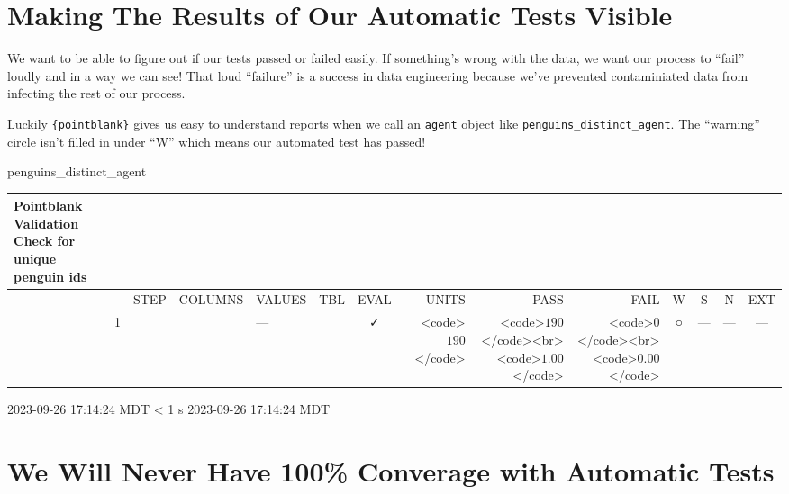 \documentclass[
  letterpaper,
  DIV=11,
  numbers=noendperiod]{scrreprt}
\newenvironment{Shaded}{\begin{snugshade}}{\end{snugshade}}
\newcommand{\NormalTok}[1]{\textcolor[rgb]{0.00,0.23,0.31}{#1}}
\begin{document}
\hypertarget{making-the-results-of-our-automatic-tests-visible}{%
\section{Making The Results of Our Automatic Tests
Visible}\label{making-the-results-of-our-automatic-tests-visible}}

We want to be able to figure out if our tests passed or failed easily.
If something's wrong with the data, we want our process to ``fail''
loudly and in a way we can see! That loud ``failure'' is a success in
data engineering because we've prevented contaminiated data from
infecting the rest of our process.

Luckily \texttt{\{pointblank\}} gives us easy to understand reports when
we call an \texttt{agent} object like
\texttt{penguins\_distinct\_agent}. The ``warning'' circle isn't filled
in under ``W'' which means our automated test has passed!

\begin{Shaded}
\begin{Highlighting}[]
\NormalTok{penguins\_distinct\_agent}
\end{Highlighting}
\end{Shaded}

\setlength{\LTpost}{0mm}
\begin{longtable}{lrlllccrrrcccc}
\caption*{
{\large Pointblank Validation} \\ 
{\small Check for unique penguin ids}
} \\ 
\toprule
 &  & STEP & COLUMNS & VALUES & TBL & EVAL & UNITS & PASS & FAIL & W & S & N & EXT \\ 
\midrule
 & 1 &  &  & — &                                                              & ✓ & <code>$190$</code> & <code>$190$</code><br><code>$1.00$</code> & <code>$0$</code><br><code>$0.00$</code> & ○ & --- & --- & --- \\ 
\bottomrule
\end{longtable}
\begin{minipage}{\linewidth}
2023-09-26 17:14:24 MDT
\textless{} 1 s
2023-09-26 17:14:24 MDT\\
\end{minipage}

\hypertarget{we-will-never-have-100-converage-with-automatic-tests}{%
\section{We Will Never Have 100\% Converage with Automatic
Tests}\label{we-will-never-have-100-converage-with-automatic-tests}}
\end{document}
